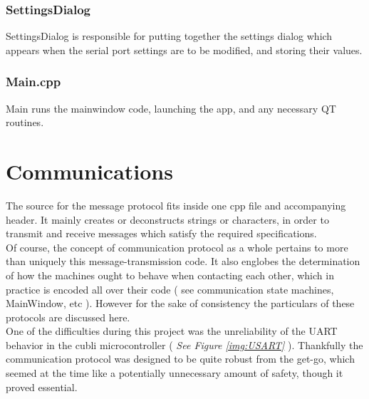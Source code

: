 \subsubsection{SettingsDialog}

SettingsDialog is responsible for putting together the settings dialog which appears when the serial port settings are to be modified, and storing their values.

\subsubsection{Main.cpp}

Main runs the mainwindow code, launching the app, and any necessary QT routines.

\section{Communications}

The source for the message protocol fits inside one cpp file and accompanying header. It mainly creates or deconstructs strings or characters, in order to transmit and receive messages which satisfy the required specifications.\\

Of course, the concept of communication protocol as a whole pertains to more than uniquely this message-transmission code. It also englobes the determination of how the machines ought to behave when contacting each other, which in practice is encoded all over their code ( see communication state machines, MainWindow, etc ). However for the sake of consistency the particulars of these protocols are discussed here.\\

One of the difficulties during this project was the unreliability of the UART behavior in the cubli microcontroller ( \textit{See Figure \ref{img:USART}} ). Thankfully the communication protocol was designed to be quite robust from the get-go, which seemed at the time like a potentially unnecessary amount of safety, though it proved essential.

